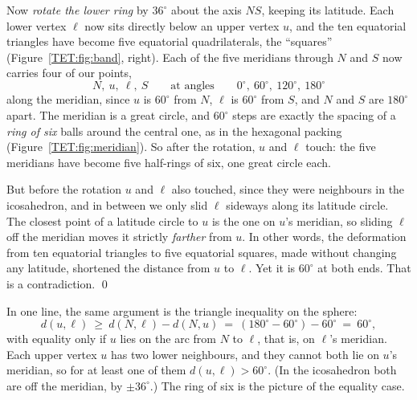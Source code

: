 \documentclass[11pt,openany]{book}
\theoremstyle{plain}
\theoremstyle{definition}
\theoremstyle{remark}
\begin{document}
Now \emph{rotate the lower ring} by $36^\circ$ about the axis $NS$, keeping its latitude. Each lower vertex
$\ell$ now sits directly below an upper vertex $u$, and the ten equatorial triangles have become five
equatorial quadrilaterals, the ``squares'' (Figure~\ref{TET:fig:band}, right). Each of the five
meridians through $N$ and $S$ now carries four of our points,
\[
  N,\ u,\ \ell,\ S\qquad\text{at angles}\qquad 0^\circ,\ 60^\circ,\ 120^\circ,\ 180^\circ
\]
along the meridian, since $u$ is $60^\circ$ from $N$, $\ell$ is $60^\circ$ from $S$, and $N$ and $S$ are
$180^\circ$ apart. The meridian is a great circle, and $60^\circ$ steps are exactly the spacing of a
\emph{ring of six} balls around the central one, as in the hexagonal packing
(Figure~\ref{TET:fig:meridian}). So after the rotation, $u$ and $\ell$ touch: the five meridians have
become five half-rings of six, one great circle each.

But before the rotation $u$ and $\ell$ also touched, since they were neighbours in the icosahedron, and
in between we only slid $\ell$ sideways along its latitude circle. The closest point of a latitude
circle to $u$ is the one on $u$'s meridian, so sliding $\ell$ off the meridian moves it strictly
\emph{farther} from $u$. In other words, the deformation from ten equatorial triangles to five
equatorial squares, made without changing any latitude, shortened the distance from $u$ to $\ell$. Yet
it is $60^\circ$ at both ends. That is a contradiction. \qed

\medskip
In one line, the same argument is the triangle inequality on the sphere:
\[
  d(u,\ell)\ \ge\ d(N,\ell)-d(N,u)\ =\ (180^\circ-60^\circ)-60^\circ\ =\ 60^\circ,
\]
with equality only if $u$ lies on the arc from $N$ to $\ell$, that is, on $\ell$'s meridian. Each upper
vertex $u$ has two lower neighbours, and they cannot both lie on $u$'s meridian, so for at least one of
them $d(u,\ell)>60^\circ$. (In the icosahedron both are off the meridian, by $\pm36^\circ$.) The ring of six
is the picture of the equality case.
\end{document}
